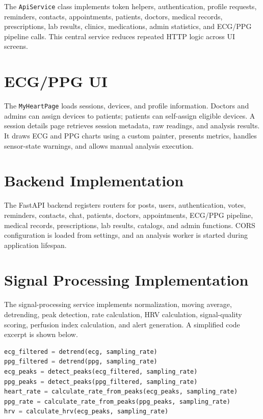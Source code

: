 The \texttt{ApiService} class implements token helpers, authentication, profile requests, reminders, contacts, appointments, patients, doctors, medical records, prescriptions, lab results, clinics, medications, admin statistics, and ECG/PPG pipeline calls. This central service reduces repeated HTTP logic across UI screens.

\section{ECG/PPG UI}

The \texttt{MyHeartPage} loads sessions, devices, and profile information. Doctors and admins can assign devices to patients; patients can self-assign eligible devices. A session details page retrieves session metadata, raw readings, and analysis results. It draws ECG and PPG charts using a custom painter, presents metrics, handles sensor-state warnings, and allows manual analysis execution.

\section{Backend Implementation}

The FastAPI backend registers routers for posts, users, authentication, votes, reminders, contacts, chat, patients, doctors, appointments, ECG/PPG pipeline, medical records, prescriptions, lab results, catalogs, and admin functions. CORS configuration is loaded from settings, and an analysis worker is started during application lifespan.

\section{Signal Processing Implementation}

The signal-processing service implements normalization, moving average, detrending, peak detection, rate calculation, HRV calculation, signal-quality scoring, perfusion index calculation, and alert generation. A simplified code excerpt is shown below.

\begin{lstlisting}[language=Python,caption={Peak-based metric workflow}]
ecg_filtered = detrend(ecg, sampling_rate)
ppg_filtered = detrend(ppg, sampling_rate)
ecg_peaks = detect_peaks(ecg_filtered, sampling_rate)
ppg_peaks = detect_peaks(ppg_filtered, sampling_rate)
heart_rate = calculate_rate_from_peaks(ecg_peaks, sampling_rate)
ppg_rate = calculate_rate_from_peaks(ppg_peaks, sampling_rate)
hrv = calculate_hrv(ecg_peaks, sampling_rate)
\end{lstlisting}

